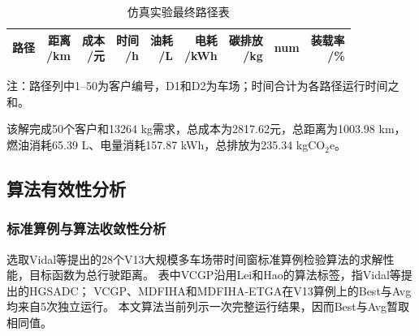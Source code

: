 \documentclass{setp-new}
\newcommand{\setptabsetup}{\small\renewcommand{\arraystretch}{0.95}\setlength{\tabcolsep}{2.2pt}\hbadness=10000}
\begin{document}
\begin{table}[H]
\centering
\setptabsetup
\caption{仿真实验最终路径表}\label{tab:final-solution}
\begin{tabular*}{\textwidth}{@{\extracolsep{\fill}}lrrrrrrrr@{}}
\toprule
路径 & \makecell{距离\\/km} & \makecell{成本\\/元} & \makecell{时间\\/h} & \makecell{油耗\\/L} & \makecell{电耗\\/kWh} & \makecell{碳排放\\/kg} & num & \makecell{装载率\\/\%}\\
\midrule

\end{tabular*}
\vspace{1pt}
\parbox{\textwidth}{\footnotesize 注：路径列中1--50为客户编号，D1和D2为车场；时间合计为各路径运行时间之和。}
\end{table}

该解完成50个客户和13264 kg需求，总成本为2817.62元，总距离为1003.98 km，
燃油消耗65.39 L、电量消耗157.87 kWh，总排放为235.34 kgCO$_2$e。

\subsection{算法有效性分析}

\subsubsection{标准算例与算法收敛性分析}

选取Vidal等提出的28个V13大规模多车场带时间窗标准算例检验算法的求解性能，目标函数为总行驶距离。
表中VCGP沿用Lei和Hao\cite{ref:75}的算法标签，指Vidal等提出的HGSADC\cite{ref:74}；
VCGP、MDFIHA和MDFIHA-ETGA在V13算例上的Best与Avg均来自5次独立运行。
本文算法当前列示一次完整运行结果，因而Best与Avg暂取相同值。
\end{document}
